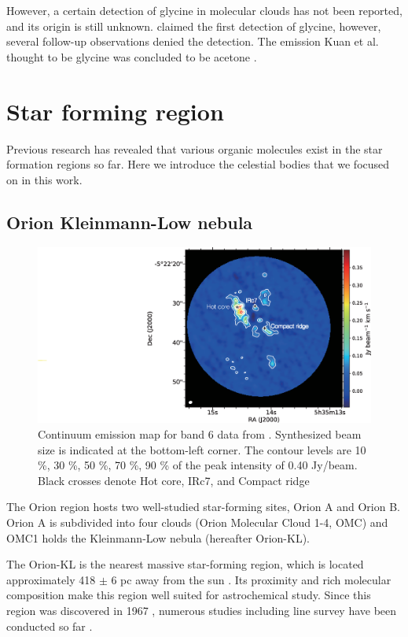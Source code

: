 However, a certain detection of glycine in molecular clouds has not been reported, and
its origin is still unknown.
\citet{Kuan+2003} claimed the first detection of glycine, however, several follow-up observations 
denied the detection.
The emission Kuan et al. thought to be glycine was concluded to be acetone
\citep[e.g.,][]{Jones+2007}.

\newpage
\section{Star forming region}
Previous research has revealed that various organic molecules exist in the star formation regions so far. 
Here we introduce the celestial bodies that we focused on in this work.
\subsection{Orion Kleinmann-Low nebula}
\begin{figure}[ht]
  \hspace{-5cm}
  \includegraphics[width=18cm]{OrionKL/Orion_cnt.eps}
  \caption{Continuum emission map for band 6 data from \citet{Hirota+2015}. Synthesized beam size is indicated at the bottom-left corner. The contour levels are 10 \%, 30 \%, 50 \%, 70 \%, 90 \% of the peak intensity of 0.40 Jy/beam. Black crosses denote Hot core, IRc7, and Compact ridge}
  \label{fig:cont+2015}
  
\end{figure}

The Orion region hosts two well-studied star-forming sites, Orion A and Orion B. 
Orion A is subdivided into four clouds (Orion Molecular Cloud 1-4, OMC) and 
OMC1 holds the Kleinmann-Low nebula (hereafter Orion-KL).

The Orion-KL is the nearest massive star-forming region, which is located approximately 
418 $\pm$ 6 pc away from the sun \citep{Kim+2008}. 
Its proximity and rich molecular composition make this region well suited for astrochemical study.
Since this region was discovered in 1967 \citep*{Kleinmann+1967},
numerous studies including line survey have been conducted so far \citep[e.g.,][]{Pagani+2017, Feng+2015, Gong+2015, Turner1991}.


